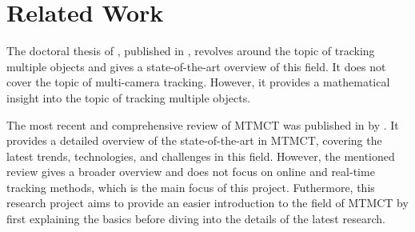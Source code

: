 \section{Related Work}\label{sec:related_work}
The doctoral thesis of \textcite[Chapter 5]{Tian19}, published in \citeyear{Tian19}, revolves around the topic of tracking multiple objects and gives a state-of-the-art overview of this field. It does not cover the topic of multi-camera tracking. However, it provides a mathematical insight into the topic of tracking multiple objects.

The most recent and comprehensive review of MTMCT was published in \citeyear{Amosa23} by \textcite{Amosa23}. It provides a detailed overview of the state-of-the-art in MTMCT, covering the latest trends, technologies, and challenges in this field. However, the mentioned review gives a broader overview and does not focus on online and real-time tracking methods, which is the main focus of this project. Futhermore, this research project aims to provide an easier introduction to the field of MTMCT by first explaining the basics before diving into the details of the latest research.